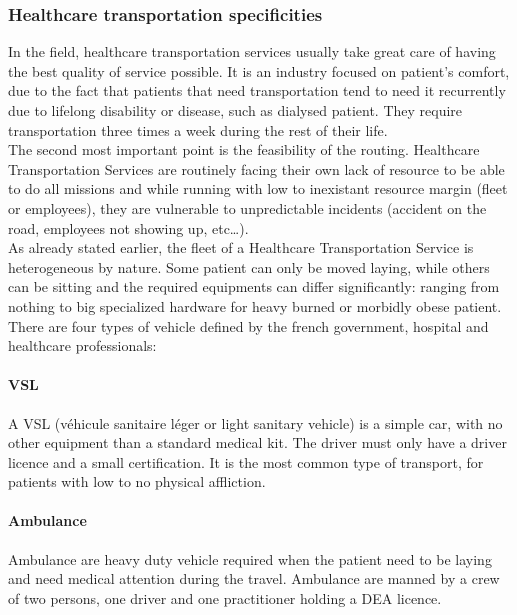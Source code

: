 \documentclass[12pt]{memoir}
\begin{document}

\subsubsection{Healthcare transportation specificities}
\label{sub:Healthcare transportation specificities}
In the field, healthcare transportation services usually take great care of having the best
quality of service possible. It is an industry focused on patient's comfort, due to the
fact that patients that need transportation tend to need it recurrently due to lifelong
disability or disease, such as dialysed patient. They require transportation three
times a week during the rest of their life. \\
The second most important point is the feasibility of the routing. Healthcare
Transportation Services are routinely facing their own lack of resource to be able
to do all missions and while running with low to inexistant resource margin (fleet or employees), they are
vulnerable to unpredictable incidents (accident on the road, employees not showing
up, etc\ldots).\\

\bigskip 
As already stated earlier, the fleet of a Healthcare Transportation Service is 
heterogeneous by nature. Some patient can only be moved laying, while others can be
sitting and  the required equipments can differ significantly: ranging from nothing to big specialized
hardware for heavy burned or morbidly obese patient.\\
There are four types of vehicle defined by the french government, hospital and healthcare professionals:

\paragraph{VSL} %
\label{par:VSL}
A VSL (véhicule sanitaire léger or light sanitary vehicle) is a simple car, with no
other equipment than a standard medical kit. The driver must only have a driver
licence and a small certification. It is the most common type of transport, for
patients with low to no physical affliction.

\paragraph{Ambulance} %
\label{par:Ambulance}
Ambulance are heavy duty vehicle required when the patient need to be laying and need
medical attention during the travel. Ambulance are manned by a crew of two persons,
one driver and one practitioner holding a DEA licence.
\end{document}
